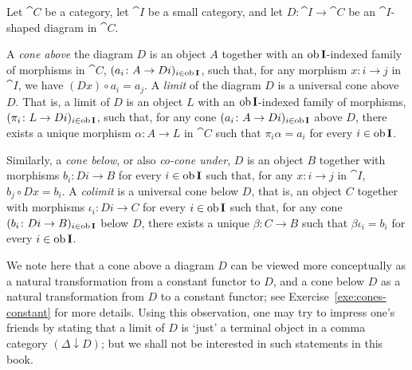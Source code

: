 \begin{definition}\label{def:limits}
  Let $\cat{C}$ be a category, let $\cat{I}$ be a small category, and let $D \colon \cat{I} \to \cat{C}$ be an $\cat{I}$-shaped diagram in $\cat{C}$.

  A \emph{cone above}  the diagram $D$ is an object $A$ together with an $\operatorname{\mathrm{ob}} \mathbf{I}$-indexed family of morphisms in $\cat{C}$,  $(a_i \colon A \to Di)_{i \in \operatorname{\mathrm{ob}} \mathbf{I}}$, such that, for any morphism $x \colon i \to j$ in $\cat{I}$, we have $(Dx) \circ a_i = a_j$.
  A \emph{limit}  of the diagram $D$ is a universal cone above $D$. That is, a limit of $D$ is an object $L$ with an $\operatorname{\mathrm{ob}} \mathbf{I}$-indexed family of morphisms, $(\pi_i \colon L \to Di)_{i \in \operatorname{\mathrm{ob}} \mathbf{I}}$, such that, for any cone $(a_i \colon A \to Di)_{i \in \operatorname{\mathrm{ob}} \mathbf{I}}$ above $D$, there exists a unique morphism $\alpha \colon A \to L$ in $\cat{C}$ such that $\pi_i \alpha = a_i$ for every $i \in \operatorname{\mathrm{ob}} \mathbf{I}$.  

  Similarly, a \emph{cone below}, or also \emph{co-cone under}, $D$ is an object $B$ together with morphisms $b_i \colon Di \to B$ for every $i \in \operatorname{\mathrm{ob}} \mathbf{I}$ such that, for any $x \colon i \to j$ in $\cat{I}$, $b_j \circ Dx = b_i$. A \emph{colimit}  is a universal cone below $D$, that is, an object $C$ together with morphisms $\iota_i \colon Di \to C$ for every $i \in \operatorname{\mathrm{ob}} \mathbf{I}$ such that, for any cone $(b_i \colon Di \to B)_{i \in \operatorname{\mathrm{ob}} \mathbf{I}}$ below $D$, there exists a unique $\beta \colon C \to B$ such that $\beta \iota_i = b_i$ for every $i \in \operatorname{\mathrm{ob}} \mathbf{I}$.
\end{definition}
We note here that a cone above a diagram $D$ can be viewed more conceptually as a natural transformation from a constant functor to $D$, and a cone below $D$ as a natural transformation from $D$ to a constant functor; see Exercise~\ref{exe:cones-constant} for more details. Using this observation, one may try to impress one's friends by stating that a limit of $D$ is `just' a terminal object in a comma category $(\Delta {\downarrow} D)$; but we shall not be interested in such statements in this book.

